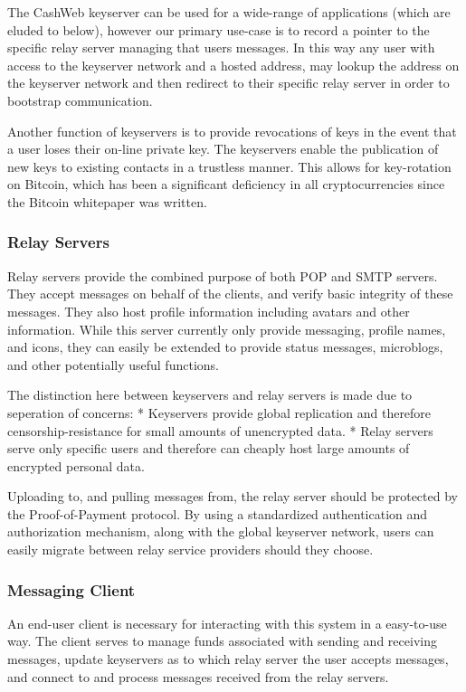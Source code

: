 \documentclass{article}
\begin{document}
The CashWeb keyserver can be used for a wide-range of applications (which are eluded to below), however our primary use-case is to record a pointer to the specific relay server managing that users messages. In this way any user with access to the keyserver network and a hosted address, may lookup the address on the keyserver network and then redirect to their specific relay server in order to bootstrap communication. 

Another function of keyservers is to provide revocations of keys in the event that a user loses their on-line private key. The keyservers enable the publication of new keys to existing contacts in a trustless manner. This allows for key-rotation on Bitcoin, which has been a significant deficiency in all cryptocurrencies since the Bitcoin whitepaper was written.

\subsubsection{Relay Servers}

Relay servers provide the combined purpose of both POP and SMTP servers. They accept messages on behalf of the clients, and verify basic integrity of these messages. They also host profile information including avatars and other information. While this server currently only provide messaging, profile names, and icons, they can easily be extended to provide status messages, microblogs, and other potentially useful functions.

The distinction here between keyservers and relay servers is made due to seperation of concerns:
* Keyservers provide global replication and therefore censorship-resistance for small amounts of unencrypted data.
* Relay servers serve only specific users and therefore can cheaply host large amounts of encrypted personal data.

Uploading to, and pulling messages from, the relay server should be protected by the Proof-of-Payment protocol. By using a standardized authentication and authorization mechanism, along with the global keyserver network, users can easily migrate between relay service providers should they choose.

\subsubsection{Messaging Client}

An end-user client is necessary for interacting with this system in a easy-to-use way. The client serves to manage funds associated with sending and receiving messages, update keyservers as to which relay server the user accepts messages, and connect to and process messages received from the relay servers.
\end{document}
